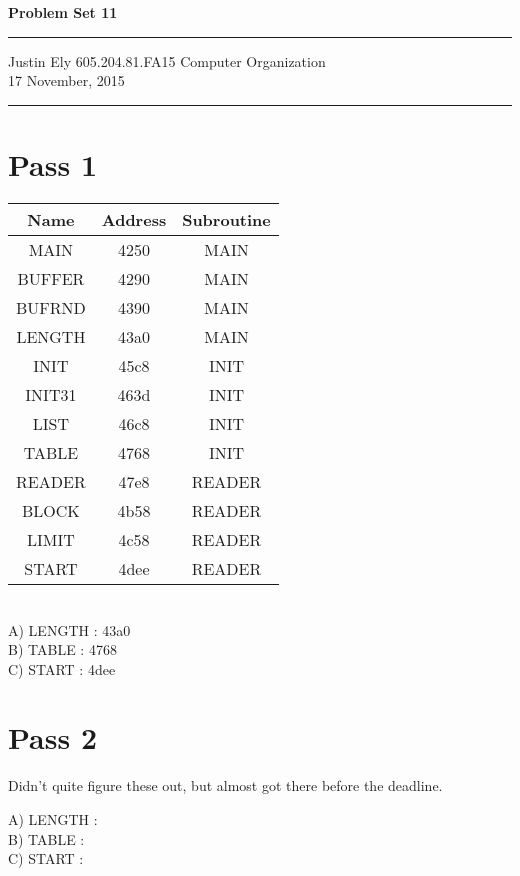 \documentclass[a4paper,11pt]{article}
\begin{document}
\begin{flushright}

\vspace{1.1cm}

{\bf\Huge Problem Set 11}

\rule{0.25\linewidth}{0.5pt}

\vspace{0.5cm}
Justin Ely
\linebreak
\newline
\footnotesize{605.204.81.FA15 Computer Organization\\}
\vspace{0.5cm}
17 November, 2015
\end{flushright}

\noindent\rule{\linewidth}{1.0pt}



\section*{Pass 1}

\begin{tabular}{ | c | c | c | }
  \hline
    Name & Address & Subroutine \\ \hline\hline
    MAIN & 4250 & MAIN \\ \hline
    BUFFER & 4290 & MAIN \\ \hline
    BUFRND & 4390 & MAIN \\ \hline
    LENGTH & 43a0 & MAIN \\ \hline
    INIT & 45c8 & INIT \\ \hline
    INIT31 & 463d & INIT \\ \hline
    LIST & 46c8 & INIT \\ \hline
    TABLE & 4768 & INIT \\ \hline
    READER & 47e8 & READER \\ \hline
    BLOCK & 4b58 & READER \\ \hline
    LIMIT & 4c58 & READER \\ \hline
    START & 4dee & READER \\ \hline
\end{tabular}\\

\noindent A) LENGTH : 43a0 \\
B) TABLE : 4768 \\
C) START : 4dee \\


\section*{Pass 2}

Didn't quite figure these out, but almost got there before the deadline.  

\noindent A) LENGTH : \\
B) TABLE : \\
C) START :  \\


\end{document}
